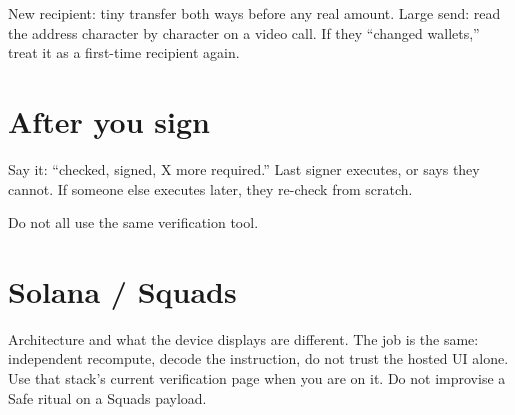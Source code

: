 New recipient: tiny transfer both ways before any
real amount. Large send: read the address
character by character on a video call. If they
``changed wallets,'' treat it as a first-time
recipient again.

\section{After you sign}

Say it: ``checked, signed, X more required.'' Last
signer executes, or says they cannot. If someone
else executes later, they re-check from scratch.

Do not all use the same verification tool.

\section{Solana / Squads}

Architecture and what the device displays are
different. The job is the same: independent
recompute, decode the instruction, do not trust
the hosted UI alone. Use that stack's current
verification page when you are on it. Do not
improvise a Safe ritual on a Squads payload.
